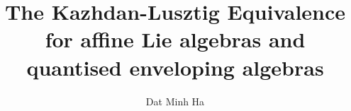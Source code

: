 

\setcounter{section}{-1}





    \title{The Kazhdan-Lusztig Equivalence for affine Lie algebras and quantised enveloping algebras}
    
    \author{Dat Minh Ha}
    \maketitle
    
    \begin{abstract}
    
    \end{abstract}
    
    {
    \hypersetup{} 
    \tableofcontents %
    }

    
    
    \printbibliography

